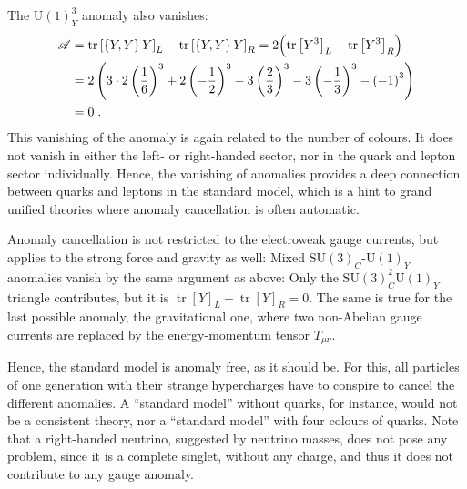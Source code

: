 \documentclass[12pt]{report}
\DeclareMathOperator{\tr}{tr}
\newcommand{\2}{\ensuremath{\sqrt{2}\,}}
\begin{document}
{        The $\mathrm{U(1)}_Y^3$ anomaly also vanishes:
        \begin{align}
          \begin{split}
            \mathscr{A} &= \tr \left[\left\{Y,Y\right\}Y\right]_L - \tr
            \left[\left\{Y,Y\right\}Y\right]_R = 2 \Bigl(\tr \left[Y^3\right]_L -\tr
              \left[Y^3\right]_R \Bigr)\\
            &= 2\left(3\cdot 2\left(\frac{1}{6}\right)^3 + 2
              \left(-\frac{1}{2}\right)^3 -3\left(\frac{2}{3}\right)^3 -3\left(-\frac{1}{3}\right)^3
              -\left(-1\right)^3 \right)\\
            &=0 \;.
          \end{split}
        \end{align}
        This vanishing of the anomaly is again related to the number of colours. It does not vanish in
        either the left- or right-handed sector, nor in the quark and lepton sector
        individually. Hence, the vanishing of anomalies provides a deep connection between quarks and 
        leptons in the
        standard model, which is a hint to grand unified theories where anomaly cancellation is often
        automatic.
        
        Anomaly cancellation is not restricted to the electroweak gauge currents, but applies to the
        strong force and gravity as well: Mixed $\mathrm{SU(3)}_C$-$\mathrm{U(1)}_Y$ anomalies
        vanish by the same argument as above: 
        Only the $\mathrm{SU(3)}_C^2\mathrm{U(1)}_Y$ triangle contributes, but it is $\tr
        \left[Y\right]_L -\tr \left[Y\right]_R =0$. The same is true for the last possible anomaly,
        the gravitational one, where two non-Abelian gauge currents are replaced by the 
        energy-momentum tensor $T_{\mu\nu}$.

        Hence, the standard model is anomaly free, as it should be. For this, all
        particles of one generation with their strange hypercharges have to  conspire
        to cancel the different anomalies. A ``standard model'' without quarks, for instance, 
        would not
        be a consistent theory, nor a ``standard model'' with four colours of quarks. Note that
        a right-handed neutrino, suggested by neutrino masses, does not pose any problem,
        since it is a complete singlet, without any charge, and thus it does not
        contribute to any gauge anomaly.
    
}
\end{document}
